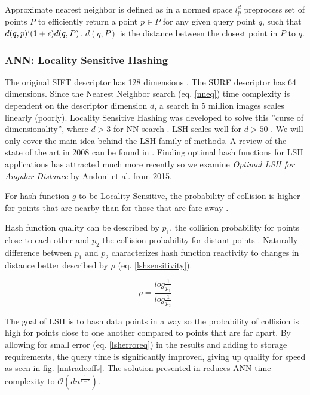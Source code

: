 \documentclass[english,12pt,a4paper,pdftex,elec,utf8]{aaltothesis}
\begin{document}
Approximate nearest neighbor is defined as in a normed space $l_p^d$ preprocess set of points $P$ to efficiently return a point $p\in P$ for any given query point $q$, such that $d(q,p) \lq (1 + \epsilon)d(q,P)$. $d(q, P)$ is the distance between the closest point in $P$ to $q$. \cite{Gionis1999}

\subsubsection{ANN: Locality Sensitive Hashing}
The original SIFT descriptor has 128 dimensions \cite{Lowe1999}.  The SURF descriptor has 64 dimensions. Since the Nearest Neighbor search (eq. \ref{nneq}) time complexity is dependent on the descriptor dimension $d$, a search in 5 million images scales linearly (poorly). Locality Sensitive Hashing was developed to solve this ''curse of dimensionality'', where $d > 3$ for NN search \cite{Gionis1999}. LSH scales well for $d > 50$ \cite{Gionis1999}. We will only cover the main idea behind the LSH family of methods. A review of the state of the art in 2008 can be found in \cite{Andoni2008}. Finding optimal hash functions for LSH applications has attracted much more recently so we examine \emph{Optimal LSH for Angular Distance} \cite{Andoni2015} by Andoni et al. from 2015.

For hash function $g$ to be Locality-Sensitive, the probability of collision is higher for points that are nearby than for those that are fare away \cite{Andoni2015}.

Hash function quality can be described by $p_1$, the collision probability for points close to each other and $p_2$ the collision probability for distant points \cite{Andoni2015}. Naturally difference between $p_1$ and $p_2$ characterizes hash function reactivity to changes in distance better described by $\rho$ (eq. \ref{lshsensitivity}).

\begin{equation}
  \label{lshsensitivity}
  \rho = \frac{log\frac{1}{p_1}}{log\frac{1}{p_2}}
  \end{equation}

The goal of LSH is to hash data points in a way so the probability of collision is high for points close to one another compared to points that are far apart. By allowing for small error (eq. \ref{lsherroreq}) in the results and adding to storage requirements, the query time is significantly improved, giving up quality for speed as seen in fig. \ref{nntradeoffs}. \cite{Gionis1999} The solution presented in \cite{Gionis1999} reduces ANN time complexity to $\mathcal{O}(dn^{\frac{1}{1+\epsilon}})$.
\end{document}
